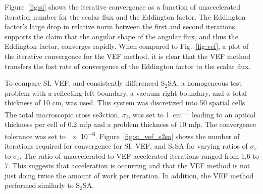  Figure~\ref{fig:si} shows the iterative convergence as a function of unaccelerated iteration number for the scalar flux and the Eddington factor. The Eddington factor's large drop in relative norm  between the first and second iterations supports the claim that the angular shape of the angular flux, and thus the Eddington factor, converges rapidly. When compared to Fig.~\ref{fig:vef}, a plot of the iterative convergence for the VEF method, it is clear that the VEF method transfers the fast rate of convergence of the Eddington factor to the scalar flux. 



To compare SI, VEF, and consistently differenced S$_2$SA, a homogeneous test problem with a reflecting left boundary, a vacuum right boundary, and a total thickness of 10 cm, was used. This system was discretized into 50 spatial cells.  The total macroscopic 
cross se3ction, $\sigma_t$, was set to \SI{1}{cm^{-1}} leading to an optical thickness per cell of 0.2 mfp and a problem thickness 
of 10 mfp. The convergence tolerance was set to \num{e-6}.   Figure~\ref{fig:si_vef_s2sa} shows the number of iterations required for convergence for SI, VEF, and S$_2$SA for varying ratios of $\sigma_s$ to $\sigma_t$. The ratio of unaccelerated to VEF accelerated iterations ranged from 1.6 to 7. This suggests that acceleration is occurring and that the VEF method is not just doing twice the amount of work per iteration. In addition, the VEF method performed similarly to S$_2$SA. 

